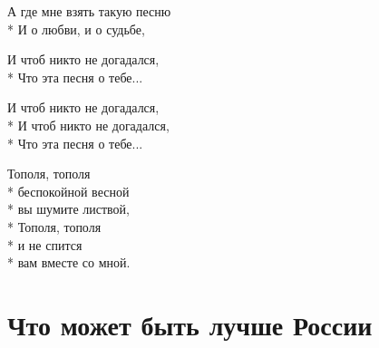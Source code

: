 \medskip

\begin{minipage}{\linewidth}
А где мне взять такую песню\\*
И о любви, и о судьбе,\\
\end{minipage}\par\medskip\nobreak

\medskip

\begin{minipage}{\linewidth}
И чтоб никто не догадался,\\*
Что эта песня о тебе...\\
\end{minipage}\par\medskip\nobreak

\medskip

\begin{minipage}{\linewidth}
И чтоб никто не догадался,\\*
И чтоб никто не догадался,\\*
Что эта песня о тебе...\\
\end{minipage}\par\medskip\nobreak

\medskip

\begin{minipage}{\linewidth}
\hspace*{1.5em}Тополя, тополя\\*
\hspace*{1.5em}беспокойной весной\\*
\hspace*{1.5em}вы шумите листвой,\\*
\hspace*{1.5em}Тополя, тополя\\*
\hspace*{1.5em}и не спится\\*
\hspace*{1.5em}вам вместе со мной.\\
\end{minipage}

\vspace{\fill}\newpage

\section{Что может быть лучше России}
\label{song:Что_может_быть_лучше_России}

